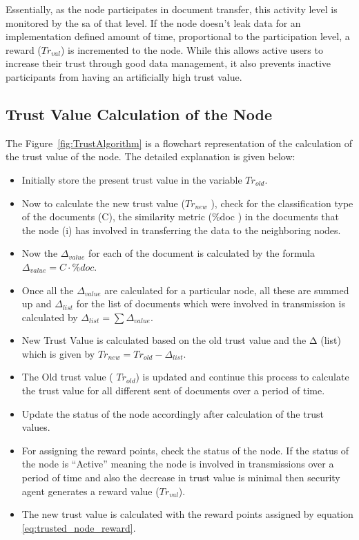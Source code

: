 Essentially, as the node participates in document transfer, this activity level
is monitored by the \gls{sa} of that level. If the node doesn't leak data for an
implementation defined amount of time, proportional to the participation level,
a reward (\(Tr_{val}\)) is incremented to the node. While this allows active
users to increase their trust through good data management, it also prevents inactive
participants from having an artificially high trust value. 
 \subsection{Trust Value Calculation of the Node}
 The Figure~\ref{fig:TrustAlgorithm} is a flowchart representation of the calculation of the trust value of the node. The detailed explanation is given below:
\begin{itemize}
    \item Initially store the present trust value in the variable \( Tr_{old} \).
    \item Now to calculate the new trust value (\( Tr_{new} \) ), check for the
    classification type of the documents (C), the similarity metric (\%doc ) in
    the documents that the node (i) has involved in transferring the data to the
    neighboring nodes.  
    \item Now the \( \Delta_{value} \) for each of the document is calculated
    by the formula  \( \Delta_{value} = C \cdot \% doc \).
    \item Once all the \( \Delta_{value} \) are calculated for a particular node, all these are
    summed up and      \( \Delta_{list} \) for the list of documents which were involved in
    transmission is calculated by \( \Delta_{list} = \sum \Delta_{value} \).  
    \item New Trust Value is calculated based on the old trust value and the Δ (list)
        which is given by \( Tr_{new} = Tr_{old} - \Delta_{list} \).
    \item The Old trust value ( \(Tr_{old} \)) is updated and continue this process to
    calculate the trust value for all different sent of documents over a period
    of time.  
    \item Update the status of the node accordingly after calculation of the
    trust values.
    \item For assigning the reward points, check the status of the node. If the status
    of the node is “Active” meaning the node is involved in transmissions over
    a period of time and also the decrease in trust value is minimal then
    security agent generates a reward value      (\( Tr_{val} \)).  
    \item The new trust value is calculated with the reward points assigned by
        equation \ref{eq:trusted_node_reward}.
\end{itemize}

